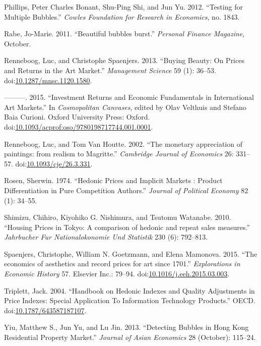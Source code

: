 \documentclass[]{elsarticle} %
\begin{document}
\hypertarget{ref-Phillips2012}{}
Phillips, Peter Charles Bonant, Shu-Ping Shi, and Jun Yu. 2012.
``Testing for Multiple Bubbles.'' \emph{Cowles Foundation for Research
in Economics}, no. 1843.

\hypertarget{ref-Rabe2011}{}
Rabe, Jo-Marie. 2011. ``Beautiful bubbles burst.'' \emph{Personal
Finance Magazine}, October.

\hypertarget{ref-Renneboog2012}{}
Renneboog, Luc, and Christophe Spaenjers. 2013. ``Buying Beauty: On
Prices and Returns in the Art Market.'' \emph{Management Science} 59
(1): 36--53.
doi:\href{https://doi.org/10.1287/mnsc.1120.1580}{10.1287/mnsc.1120.1580}.

\hypertarget{ref-Renneboog2014}{}
---------. 2015. ``Investment Returns and Economic Fundamentals in
International Art Markets.'' In \emph{Cosmopolitan Canvases}, edited by
Olav Velthuis and Stefano Baia Curioni. Oxford University Press: Oxford.
doi:\href{https://doi.org/10.1093/acprof:oso/9780198717744.001.0001}{10.1093/acprof:oso/9780198717744.001.0001}.

\hypertarget{ref-Renneboog2002}{}
Renneboog, Luc, and Tom Van Houtte. 2002. ``The monetary appreciation of
paintings: from realism to Magritte.'' \emph{Cambridge Journal of
Economics} 26: 331--57.
doi:\href{https://doi.org/10.1093/cje/26.3.331}{10.1093/cje/26.3.331}.

\hypertarget{ref-Rosen1974}{}
Rosen, Sherwin. 1974. ``Hedonic Prices and Implicit Markets : Product
Differentiation in Pure Competition Authors.'' \emph{Journal of
Political Economy} 82 (1): 34--55.

\hypertarget{ref-Shimizu2010}{}
Shimizu, Chihiro, Kiyohiko G. Nishimura, and Tsutomu Watanabe. 2010.
``Housing Prices in Tokyo: A comparison of hedonic and repeat sales
measures.'' \emph{Jahrbucher Fur Nationalokonomie Und Statistik} 230
(6): 792--813.

\hypertarget{ref-Spaenjers2015}{}
Spaenjers, Christophe, William N. Goetzmann, and Elena Mamonova. 2015.
``The economics of aesthetics and record prices for art since 1701.''
\emph{Explorations in Economic History} 57. Elsevier Inc.: 79--94.
doi:\href{https://doi.org/10.1016/j.eeh.2015.03.003}{10.1016/j.eeh.2015.03.003}.

\hypertarget{ref-Triplett2004}{}
Triplett, Jack. 2004. ``Handbook on Hedonic Indexes and Quality
Adjustments in Price Indexes: Special Application To Information
Technology Products.'' OECD.
doi:\href{https://doi.org/10.1787/643587187107}{10.1787/643587187107}.

\hypertarget{ref-Yiu2013}{}
Yiu, Matthew S., Jun Yu, and Lu Jin. 2013. ``Detecting Bubbles in Hong
Kong Residential Property Market.'' \emph{Journal of Asian Economics} 28
(October): 115--24.
\end{document}
